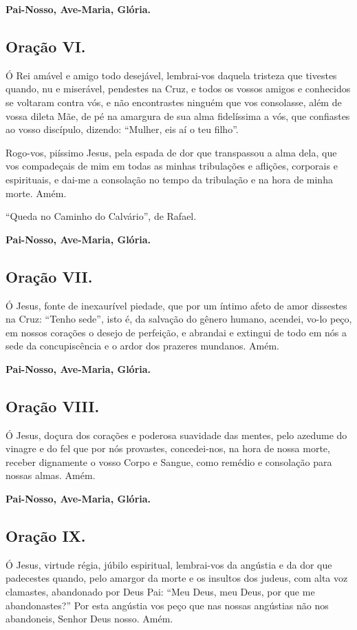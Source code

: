 \documentclass[11pt]{article}
\begin{document}
\textbf{Pai-Nosso, Ave-Maria, Glória.}

\subsection{Oração VI.}
Ó Rei amável e amigo todo desejável, lembrai-vos daquela tristeza que tivestes quando, nu e miserável, pendestes na Cruz, e todos os vossos amigos e conhecidos se voltaram contra vós, e não encontrastes ninguém que vos consolasse, além de vossa dileta Mãe, de pé na amargura de sua alma fidelíssima a vós, que confiastes ao vosso discípulo, dizendo: “Mulher, eis aí o teu filho”.

Rogo-vos, piíssimo Jesus, pela espada de dor que transpassou a alma dela, que vos compadeçais de mim em todas as minhas tribulações e aflições, corporais e espirituais, e dai-me a consolação no tempo da tribulação e na hora de minha morte. Amém. 

“Queda no Caminho do Calvário”, de Rafael.

\textbf{Pai-Nosso, Ave-Maria, Glória.}

\subsection{Oração VII.}
Ó Jesus, fonte de inexaurível piedade, que por um íntimo afeto de amor dissestes na Cruz: “Tenho sede”, isto é, da salvação do gênero humano, acendei, vo-lo peço, em nossos corações o desejo de perfeição, e abrandai e extingui de todo em nós a sede da concupiscência e o ardor dos prazeres mundanos. Amém. 

\textbf{Pai-Nosso, Ave-Maria, Glória.}

\subsection{Oração VIII.}
Ó Jesus, doçura dos corações e poderosa suavidade das mentes, pelo azedume do vinagre e do fel que por nós provastes, concedei-nos, na hora de nossa morte, receber dignamente o vosso Corpo e Sangue, como remédio e consolação para nossas almas. Amém. 

\textbf{Pai-Nosso, Ave-Maria, Glória.}

\subsection{Oração IX.}
Ó Jesus, virtude régia, júbilo espiritual, lembrai-vos da angústia e da dor que padecestes quando, pelo amargor da morte e os insultos dos judeus, com alta voz clamastes, abandonado por Deus Pai: “Meu Deus, meu Deus, por que me abandonastes?” Por esta angústia vos peço que nas nossas angústias não nos abandoneis, Senhor Deus nosso. Amém. 
\end{document}
